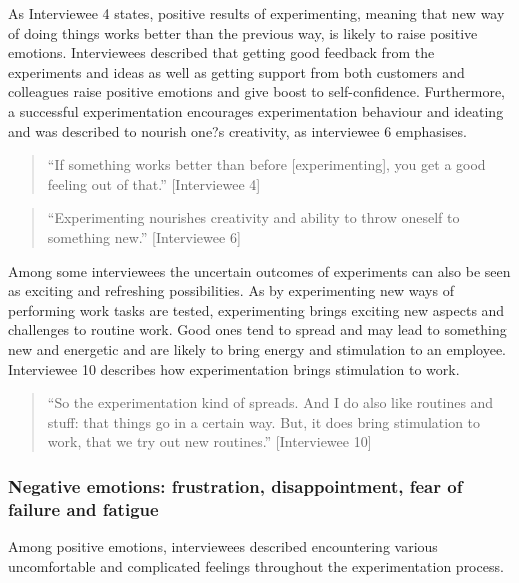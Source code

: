 As Interviewee 4 states, positive results of experimenting, meaning that new way of doing things works better than the previous way, is likely to raise positive emotions. Interviewees described that getting good feedback from the experiments and ideas as well as getting support from both customers and colleagues raise positive emotions and give boost to self-confidence. Furthermore, a successful experimentation encourages experimentation behaviour and ideating and was described to nourish one?s creativity, as interviewee 6 emphasises.  
\begin{quote}
``If something works better than before [experimenting], you get a good feeling out of that.'' [Interviewee 4]
\end{quote}
\begin{quote}
``Experimenting nourishes creativity and ability to throw oneself to something new.'' [Interviewee 6]
\end{quote}
Among some interviewees the uncertain outcomes of experiments can also be seen as exciting and refreshing possibilities. As by experimenting new ways of performing work tasks are tested, experimenting brings exciting new aspects and challenges to routine work. Good ones tend to spread and may lead to something new and energetic and are likely to bring energy and stimulation to an employee. Interviewee 10 describes how experimentation brings stimulation to work. 
\begin{quote}
``So the experimentation kind of spreads. And I do also like routines and stuff: that things go in a certain way. But, it does bring stimulation to work, that we try out new routines.'' [Interviewee 10]
\end{quote}

\subsubsection{Negative emotions: frustration, disappointment, fear of failure and fatigue}
Among positive emotions, interviewees described encountering various uncomfortable and complicated feelings throughout the experimentation process. 

